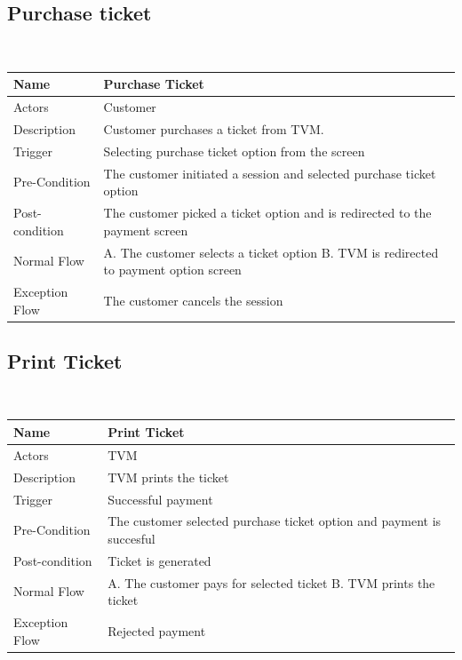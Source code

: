 \documentclass{article}
\begin{document}
{\subsection{Purchase ticket}
\hskip1cm\
\begin{tabular}{|p{3cm}|p{6cm}|}
    \hline
    Name & Purchase Ticket\\
    \hline
    Actors & Customer\\
    \hline
    Description & Customer purchases a ticket from TVM.\\
    \hline
    Trigger & Selecting purchase ticket option from the screen\\
    \hline
    Pre-Condition & The customer initiated a session and selected purchase ticket option\\
    \hline
    Post-condition & The customer picked a ticket option and is redirected to the payment screen\\
    \hline
    Normal Flow &
        A. The customer selects a ticket option\newline
        B. TVM is redirected to payment option screen\\
    \hline
    Exception Flow & The customer cancels the session\\
    \hline
\end{tabular}
\subsection{Print Ticket}
\hskip1cm\
\begin{tabular}{|p{3cm}|p{6cm}|}
    \hline
    Name & Print Ticket\\
    \hline
    Actors & TVM\\
    \hline
    Description & TVM prints the ticket\\
    \hline
    Trigger & Successful payment\\
    \hline
    Pre-Condition & The customer selected purchase ticket option and payment is succesful\\
    \hline
    Post-condition & Ticket is generated\\
    \hline
    Normal Flow &
    A. The customer pays for selected ticket\newline
    B. TVM prints the ticket\\
    \hline
    Exception Flow & Rejected payment\\
    \hline
\end{tabular}
}
\end{document}
